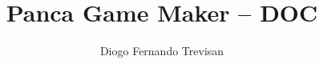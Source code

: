 \documentclass[a4paper,12pt]{report}%
\title{Panca Game Maker -- DOC}
\author{Diogo Fernando Trevisan}
\date{}
\begin{document}
	\begin{titlepage}
		\maketitle
	\end{titlepage}
	
\end{document}
